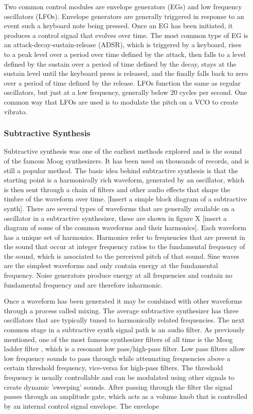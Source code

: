 Two common control modules are envelope generators (EGs) and low frequency oscillators (LFOs). Envelope generators are generally triggered in response to an event such a keyboard note being pressed. Once an EG has been initiated, it produces a control signal that evolves over time. The most common type of EG is an attack-decay-sustain-release (ADSR), which is triggered by a keyboard, rises to a peak level over a period over time defined by the attack, then falls to a level defined by the sustain over a period of time defined by the decay, stays at the sustain level until the keyboard press is released, and the finally falls back to zero over a period of time defined by the release. LFOs function the same as regular oscillators, but just at a low frequency, generally below 20 cycles per second. One common way that LFOs are used is to modulate the pitch on a VCO to create vibrato.

\subsubsection{Subtractive Synthesis}
Subtractive synthesis was one of the earliest methods explored and is the sound of the famous Moog synthesizers. It has been used on thousands of records, and is still a popular method. The basic idea behind subtractive synthesis is that the starting point is a harmonically rich waveform, generated by an oscillator, which is then sent through a chain of filters and other audio effects that shape the timbre of the waveform over time. [Insert a simple block diagram of a subtractive synth]. There are several types of waveforms that are generally available on a oscillator in a subtractive synthesizer, these are shown in figure X [insert a diagram of some of the common waveforms and their harmonics]. Each waveform has a unique set of harmonics. Harmonics refer to frequencies that are present in the sound that occur at integer frequency ratios to the fundamental frequency of the sound, which is associated to the perceived pitch of that sound. Sine waves are the simplest waveforms and only contain energy at the fundamental frequency. Noise generators produce energy at all frequencies and contain no fundamental frequency and are therefore inharmonic.

Once a waveform has been generated it may be combined with other waveforms through a process called mixing. The average subtractive synthesizer has three oscillators \cite{russ2012sound} that are typically tuned to harmonically related frequencies. The next common stage in a subtractive synth signal path is an audio filter. As previously mentioned, one of the most famous synthesizer filters of all time is the Moog ladder filter \cite{moog1965voltage}, which is a resonant low pass/high-pass filter. Low pass filters allow low frequency sounds to pass through while attenuating frequencies above a certain threshold frequency, vice-versa for high-pass filters. The threshold frequency is usually controllable and can be modulated using other signals to create dynamic 'sweeping' sounds. After passing through the filter the signal passes through an amplitude gate, which acts as a volume knob that is controlled by an internal control signal envelope. The envelope 

